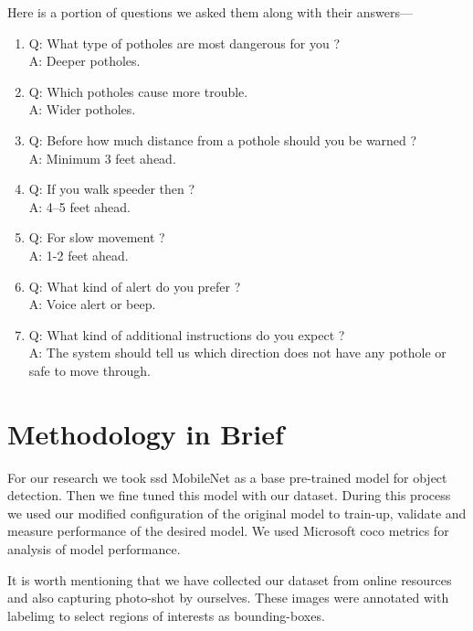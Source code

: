     Here is a portion of questions we asked them along with their answers---
    \begin{enumerate}
        \item{Q: What type of potholes are most dangerous for you ? \\
        A: Deeper potholes.}
        
        \item{Q: Which potholes cause more trouble. \\
        A: Wider potholes.}
        
        \item{Q: Before how much distance from a pothole should you be warned ?\\
        A: Minimum 3 feet ahead.}
        
        \item{Q: If you walk speeder then ?\\
        A: 4--5 feet ahead.}
        
        \item{Q: For slow movement ?\\
        A: 1-2 feet ahead.}
        
        \item{Q: What kind of alert do you prefer ?\\
        A: Voice alert or beep.}
        
        \item{Q: What kind of additional instructions do you expect ?\\
        A: The system should tell us which direction does not have any pothole or safe to move through.}
    \end{enumerate}
    
\section{Methodology in Brief}
    For our research we took \acrfull{ssd} MobileNet as a base pre-trained model for object detection. Then we fine tuned this model with our dataset. During this process we used our modified configuration of the original model to train-up, validate and measure performance of the desired model. We used Microsoft \acrfull{coco} metrics for analysis of model performance.
    
    It is worth mentioning that we have collected our dataset from online resources and also capturing photo-shot by ourselves. These images were annotated with \gls{labelimg} to select regions of interests as bounding-boxes.
    
